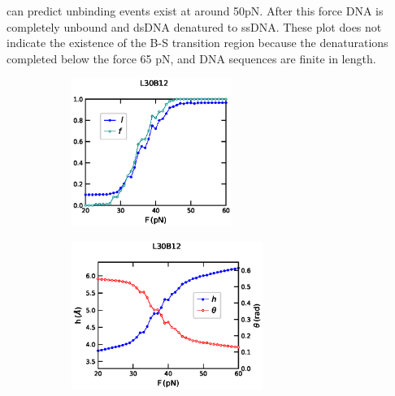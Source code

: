 \documentclass[12pt,masters,final]{UTRGVthesis}
\begin{document}
can predict unbinding events exist at around 50pN. After this force DNA is completely unbound and dsDNA denatured to ssDNA. These plot does not indicate the existence of the B-S transition region because the denaturations completed below the force 65 pN, and  DNA sequences are finite in length.
\newpage
%  
  \begin{figure}[!h]
        \begin{subfigure}[b]{0.49\textwidth}
                \centering
                \includegraphics[scale=0.35,height=1.9in, width=.8\textwidth]{L30B12_Strunz_force_lf.eps}
                \caption{}
                \label{fig:L30B12lf}
        \end{subfigure}%
        \hspace{-0.5cm}
        \begin{subfigure}[b]{0.49\textwidth}
                \centering
                \includegraphics[scale=0.35,height=1.9in, width=.8\textwidth]{L30B12_Strunz_force_h_theta.eps}
                \caption{}
                \label{fig:L30B12htheta}
        \end{subfigure}%
        

\end{figure}
\end{document}
